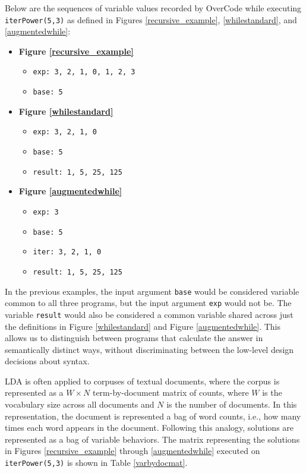 Below are the sequences of variable values recorded by OverCode while executing \texttt{iterPower(5,3)} as defined in Figures \ref{recursive_example}, \ref{whilestandard}, and \ref{augmentedwhile}:
\begin{itemize}
  \item {\bf Figure \ref{recursive_example}}
  \begin{itemize}
  \setlength\itemsep{0.05em}
  \item \texttt{exp: 3, 2, 1, 0, 1, 2, 3}
  \item \texttt{base: 5}
  \end{itemize}
  \item {\bf Figure \ref{whilestandard}}
  \begin{itemize}
  \item \texttt{exp: 3, 2, 1, 0}
  \item \texttt{base: 5}
  \item \texttt{result: 1, 5, 25, 125}
  \end{itemize}
  \item {\bf Figure \ref{augmentedwhile}}
  \begin{itemize}
  \item \texttt{exp: 3}
  \item \texttt{base: 5}
  \item \texttt{iter: 3, 2, 1, 0}
  \item \texttt{result: 1, 5, 25, 125}
  \end{itemize}
\end{itemize}

In the previous examples, the input argument \texttt{base} would be considered variable common to all three programs, but the input argument \texttt{exp} would not be. The variable \texttt{result} would also be considered a common variable shared across just the definitions in Figure \ref{whilestandard} and Figure \ref{augmentedwhile}. This allows us to distinguish between programs that calculate the answer in semantically distinct ways, without discriminating between the low-level design decisions about syntax. 

LDA is often applied to corpuses of textual documents, where the corpus is represented as a $W \times N$ term-by-document matrix of counts, where $W$ is the vocabulary size across all documents and $N$ is the number of documents. In this representation, the document is represented a bag of word counts, i.e., how many times each word appears in the document. Following this analogy, solutions are represented as a bag of variable behaviors. The matrix representing the solutions in Figures \ref{recursive_example} through \ref{augmentedwhile} executed on \texttt{iterPower(5,3)} is shown in Table \ref{varbydocmat}.

